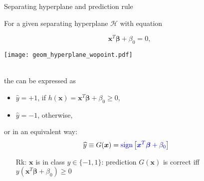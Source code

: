 \begin{frame}{Separating hyperplane and prediction rule}

 For a given separating {hyperplane} $\mathcal{H}$ with equation \medskip \\
  \begin{minipage}{.4\textwidth}
\begin{center}
                   $$
 \boldsymbol{x}^T \boldsymbol{\beta} + \beta_0 = 0, 
 $$
\end{center}
\end{minipage}
\quad
 \begin{minipage}{.3\textwidth}
  \begin{center}
   \texttt{[image: geom\_hyperplane\_wopoint.pdf]}
  \end{center}
 \end{minipage} \bigskip \\
 the  can be expressed as
\begin{itemize}
 \item $\widehat{y}=+1$, if $h(\boldsymbol{x})= \boldsymbol{x}^T \boldsymbol{\beta} + \beta_0 \ge 0$,
 \item  $\widehat{y}=-1$, otherwise,
\end{itemize}
or in an equivalent way:
\begin{align*}
 \widehat{y} &\equiv G(\boldsymbol{x}) = {\textcolor{blue}{ \operatorname{sign}{\left[  \boldsymbol{x}^T \boldsymbol{\beta} + \beta_0 \right]} }}
\end{align*}

\begin{itemize}
 \item[Rk:] $\boldsymbol{x}$ is in class  $y \in\{-1,1\}$: prediction $G(\boldsymbol{x})$ is correct %
 iff $y \left(  \boldsymbol{x}^T \boldsymbol{\beta} + \beta_0 \right )  \ge 0$
 \end{itemize}

\end{frame}




